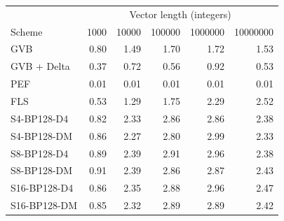 \begin{tabular}{lrrrrr}
\toprule
 & \multicolumn{5}{c}{Vector length (integers)} \\
Scheme & 1000 & 10000 & 100000 & 1000000 & 10000000 \\
\midrule
GVB & 0.80 & 1.49 & 1.70 & 1.72 & 1.53 \\
GVB + Delta & 0.37 & 0.72 & 0.56 & 0.92 & 0.53 \\
PEF & 0.01 & 0.01 & 0.01 & 0.01 & 0.01 \\
FLS & 0.53 & 1.29 & 1.75 & 2.29 & 2.52 \\
S4-BP128-D4 & 0.82 & 2.33 & 2.86 & 2.86 & 2.38 \\
S4-BP128-DM & 0.86 & 2.27 & 2.80 & 2.99 & 2.33 \\
S8-BP128-D4 & 0.89 & 2.39 & 2.91 & 2.96 & 2.38 \\
S8-BP128-DM & 0.91 & 2.39 & 2.86 & 2.87 & 2.43 \\
S16-BP128-D4 & 0.86 & 2.35 & 2.88 & 2.96 & 2.47 \\
S16-BP128-DM & 0.85 & 2.32 & 2.89 & 2.89 & 2.42 \\
\bottomrule
\end{tabular}
